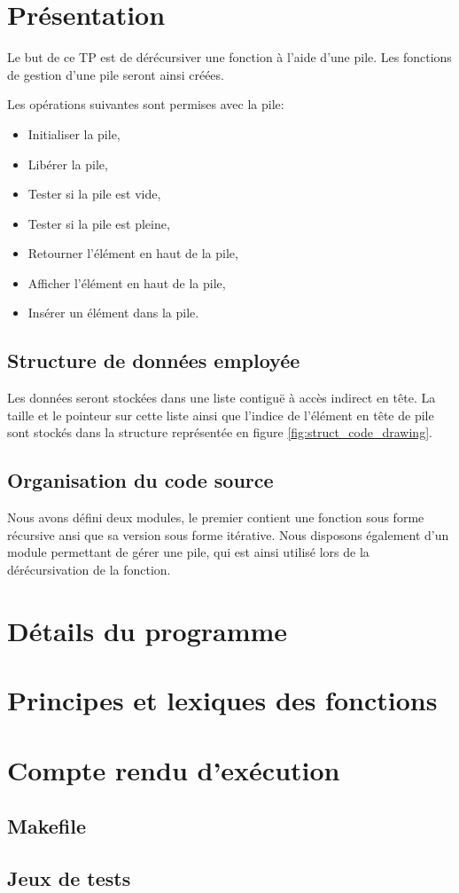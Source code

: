 \documentclass{report}
\begin{document}
  
  \tableofcontents
  \setlength{\parskip}{10pt}
  \setlength{\parindent}{0pt}
  \chapter{Présentation}
    Le but de ce TP est de dérécursiver une fonction à l'aide d'une pile. Les fonctions de gestion d'une pile seront ainsi créées.

    Les opérations suivantes sont permises avec la pile:
    \begin{itemize}
      \item Initialiser la pile,
      \item Libérer la pile,
      \item Tester si la pile est vide,
      \item Tester si la pile est pleine,
      \item Retourner l'élément en haut de la pile,
      \item Afficher l'élément en haut de la pile,
      \item Insérer un élément dans la pile.
    \end{itemize}

    \section{Structure de données employée}
      Les données seront stockées dans une liste contiguë à accès indirect en tête. La taille et le pointeur sur cette liste ainsi que l'indice de l'élément en tête de pile sont stockés dans la structure représentée en figure \ref{fig:struct_code_drawing}.
      
    \section{Organisation du code source}
      Nous avons défini deux modules, le premier contient une fonction sous forme récursive ansi que sa version sous forme itérative. Nous disposons également d'un module permettant de gérer une pile, qui est ainsi utilisé lors de la dérécursivation de la fonction.

      
  \chapter{Détails du programme}
    

  \chapter{Principes et lexiques des fonctions}
    

  \chapter{Compte rendu d'exécution}
    \section{Makefile}

    \section{Jeux de tests}
      
\end{document}
